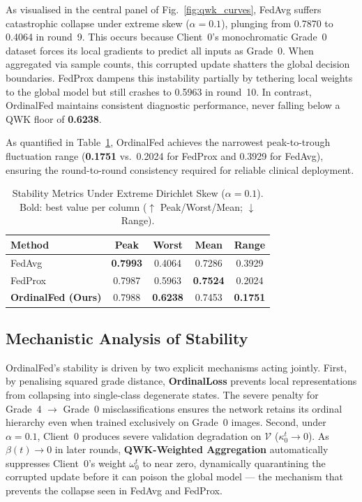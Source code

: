 As visualised in the central panel of Fig.~\ref{fig:qwk_curves}, FedAvg suffers
catastrophic collapse under extreme skew ($\alpha=0.1$), plunging from 0.7870 to
0.4064 in round~9. This occurs because Client~0's monochromatic Grade~0 dataset
forces its local gradients to predict all inputs as Grade~0. When aggregated via
sample counts, this corrupted update shatters the global decision boundaries.
FedProx dampens this instability partially by tethering local weights to the global
model but still crashes to 0.5963 in round~10. In contrast, OrdinalFed maintains
consistent diagnostic performance, never falling below a QWK floor of \textbf{0.6238}.

As quantified in Table~\ref{tab:stability}, OrdinalFed achieves the narrowest
peak-to-trough fluctuation range (\textbf{0.1751} vs.\ 0.2024 for FedProx and
0.3929 for FedAvg), ensuring the round-to-round consistency required for reliable
clinical deployment.

\begin{table}[t]
\caption{Stability Metrics Under Extreme Dirichlet Skew ($\alpha=0.1$).
Bold: best value per column ($\uparrow$ Peak/Worst/Mean; $\downarrow$ Range).}
\label{tab:stability}
\centering
\setlength{\tabcolsep}{4pt}
\begin{tabular}{@{}lcccc@{}}
\toprule
\textbf{Method} &
\textbf{Peak} &
\textbf{Worst} &
\textbf{Mean} &
\textbf{Range} \\
\midrule
FedAvg~\cite{mcmahan2017fedavg}
  & \textbf{0.7993} & 0.4064 & 0.7286 & 0.3929 \\
FedProx~\cite{li2020fedprox}
  & 0.7987 & 0.5963 & \textbf{0.7524} & 0.2024 \\
\textbf{OrdinalFed (Ours)}
  & 0.7988 & \textbf{0.6238} & 0.7453 & \textbf{0.1751} \\
\bottomrule
\end{tabular}
\end{table}

\subsection{Mechanistic Analysis of Stability}

OrdinalFed's stability is driven by two explicit mechanisms acting jointly.
First, by penalising squared grade distance, \textbf{OrdinalLoss} prevents local
representations from collapsing into single-class degenerate states. The severe
penalty for Grade~4 $\to$ Grade~0 misclassifications ensures the network retains
its ordinal hierarchy even when trained exclusively on Grade~0 images. Second,
under $\alpha=0.1$, Client~0 produces severe validation degradation on $\mathcal{V}$
($\kappa_0^t \to 0$). As $\beta(t) \to 0$ in later rounds,
\textbf{QWK-Weighted Aggregation} automatically suppresses Client~0's weight
$\omega_0^t$ to near zero, dynamically quarantining the corrupted update before it
can poison the global model --- the mechanism that prevents the collapse seen in
FedAvg and FedProx.

